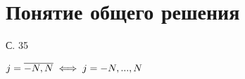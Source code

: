 \section{Понятие общего решения}

С. 35
\begin{notation}
    $ j = \overline{-N, N} \iff j = -N, ..., N $
\end{notation}
